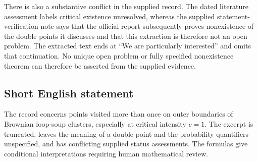 \documentclass[11pt]{article}
\begin{document}
There is also a substantive conflict in the supplied record. The dated literature assessment labels critical existence unresolved, whereas the supplied statement-verification note says that the official report subsequently proves nonexistence of the double points it discusses and that this extraction is therefore not an open problem. The extracted text ends at ``We are particularly interested'' and omits that continuation. No unique open problem or fully specified nonexistence theorem can therefore be asserted from the supplied evidence.
\subsection{Short English statement}
The record concerns points visited more than once on outer boundaries of Brownian loop-soup clusters, especially at critical intensity \(c=1\). The excerpt is truncated, leaves the meaning of a double point and the probability quantifiers unspecified, and has conflicting supplied status assessments. The formulas give conditional interpretations requiring human mathematical review.
\end{document}
